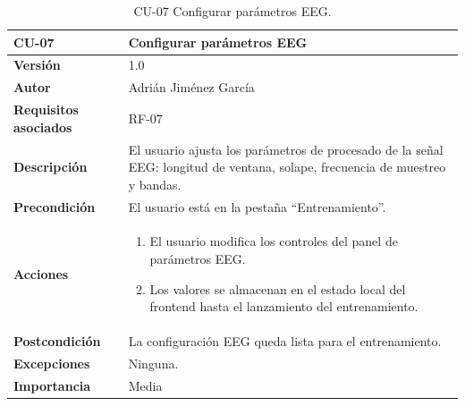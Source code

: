 \begin{table}[p]
	\centering
	\begin{tabularx}{\linewidth}{ p{} X }
		\toprule
		\textbf{CU-07}    & \textbf{Configurar parámetros EEG}\\
		\toprule
		\textbf{Versión}              & 1.0 \\
		\textbf{Autor}                & Adrián Jiménez García \\
		\textbf{Requisitos asociados} & RF-07 \\
		\textbf{Descripción}          & El usuario ajusta los parámetros de procesado de la señal EEG: longitud de ventana, solape, frecuencia de muestreo y bandas. \\
		\textbf{Precondición}         & El usuario está en la pestaña ``Entrenamiento''. \\
		\textbf{Acciones}             &
		\begin{enumerate}
			\def\labelenumi{\arabic{enumi}.}
			\tightlist
			\item El usuario modifica los controles del panel de parámetros EEG.
			\item Los valores se almacenan en el estado local del frontend hasta el lanzamiento del entrenamiento.
		\end{enumerate}\\
		\textbf{Postcondición}        & La configuración EEG queda lista para el entrenamiento. \\
		\textbf{Excepciones}          & Ninguna. \\
		\textbf{Importancia}          & Media \\
		\bottomrule
	\end{tabularx}
	\caption{CU-07 Configurar parámetros EEG.}
\end{table}

